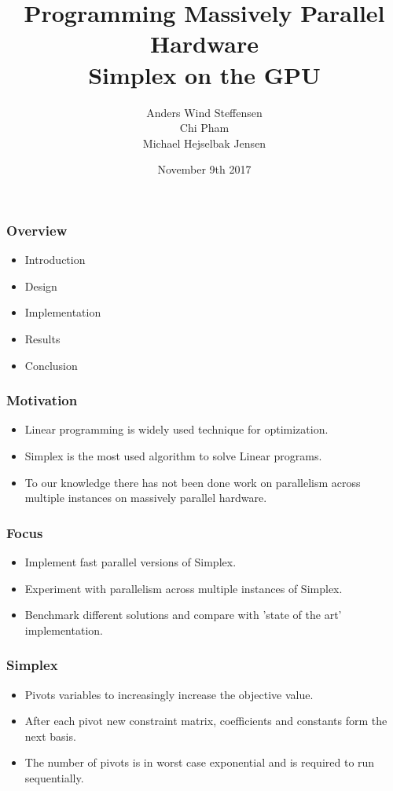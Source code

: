 \documentclass{beamer}
\title{Programming Massively Parallel Hardware\\\textbf{Simplex on the GPU}}
\author[]{%
  Anders Wind Steffensen \\
  Chi Pham \\
  Michael Hejselbak Jensen \\
}
\institute{Department of Computer Science (DIKU)\\University of Copenhagen}
\date[3/3]{November 9th 2017}
\begin{document}
\titleslide


\begin{frame}
  \frametitle{Overview}
  \begin{itemize}
  \item Introduction
  \item Design
  \item Implementation
  \item Results
  \item Conclusion
  \end{itemize}
\end{frame}


\begin{frame}
\frametitle{Motivation}
\begin{itemize}
	\item Linear programming is widely used technique for optimization.
	\item Simplex is the most used algorithm to solve Linear programs.
	\item To our knowledge there has not been done work on parallelism across multiple instances on massively parallel hardware.
\end{itemize}
\end{frame}

\begin{frame}
\frametitle{Focus}
\begin{itemize}
\item Implement fast parallel versions of Simplex.
\item Experiment with parallelism across multiple instances of Simplex.
\item Benchmark different solutions and compare with 'state of the art' implementation.
\end{itemize}
\end{frame}


\begin{frame}
\frametitle{Simplex}
\begin{itemize}
\item Pivots variables to increasingly increase the objective value.
\item After each pivot new constraint matrix, coefficients and constants form the next basis.
\item The number of pivots is in worst case exponential and is required to run sequentially.
\end{itemize}
\end{frame}
\end{document}
